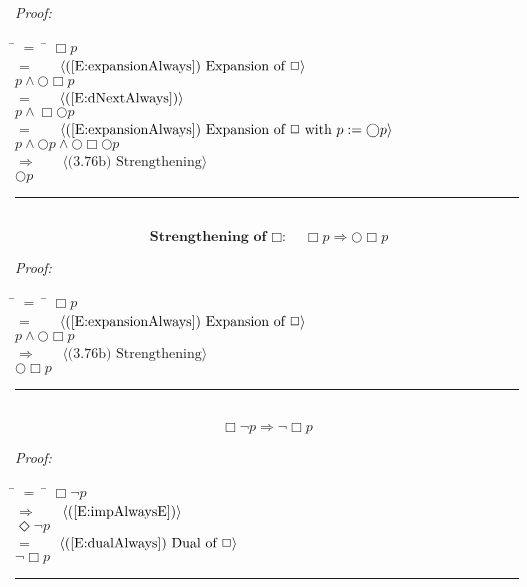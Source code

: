 \documentclass[fleqn, leqno]{article}
\newcommand{\lgap}{2pt}                             %
\newcommand{\mymathindent}{24pt}                    %
\newcommand{\Next}{\bigcirc}
\newcommand{\Event}{\Diamond}
\newcommand{\Always}{\Box}
\newcommand{\myqed}{\hfill\rule[-.23ex]{1.2ex}{2.0ex}}
\newcommand{\Gll} {\langle}                         %
\newcommand{\Ggg} {\rangle}                         %
\newcommand{\Hint}[1]     {\ \ \ $\Gll              \mbox{#1} \Ggg$ }   %
\begin{document}
\emph{Proof:}
\begin{tabbing}
\hspace{\mymathindent} \= $= \;$ \= \kill
  \> \>   $\Always p$\\[\lgap]
  \> $=$  \>  \Hint{(\ref{E:expansionAlways}) Expansion of $\Always$}\\[\lgap]
  \> \>   $p \land \Next\Always p$\\[\lgap]
  \> $=$  \>  \Hint{(\ref{E:dNextAlways})}\\[\lgap]
  \> \>   $p \land \Always\Next p$\\[\lgap]
  \> $=$  \>  \Hint{(\ref{E:expansionAlways}) Expansion of $\Always$ with $p := \Next p$}\\[\lgap]
  \> \>   $p \land \Next p \land \Next\Always\Next p$\\[\lgap]
  \> $\Rightarrow$  \>  \Hint{(3.76b) Strengthening}\\[\lgap]
  \> \>   $\Next p$\\[\lgap]
\end{tabbing}
\myqed\\[\lgap]


\begin{equation}\label{E:impAlwaysNA}
\textbf{Strengthening of $\Always$:}\quad \Always p \Rightarrow \Next\Always p
\end{equation}

\emph{Proof:}
\begin{tabbing}
\hspace{\mymathindent} \= $= \;$ \= \kill
  \> \>   $\Always p$\\[\lgap]
  \> $=$  \>  \Hint{(\ref{E:expansionAlways}) Expansion of $\Always$}\\[\lgap]
  \> \>   $p \land \Next\Always p$\\[\lgap]
  \> $\Rightarrow$  \>  \Hint{(3.76b) Strengthening}\\[\lgap]
  \> \>   $\Next\Always p$\\[\lgap]
\end{tabbing}
\myqed\\[\lgap]


\begin{equation}\label{E:exAlwaysNot}
\Always\lnot p \Rightarrow \lnot\Always p
\end{equation}

\emph{Proof:}
\begin{tabbing}
\hspace{\mymathindent} \= $= \;$ \= \kill
  \> \>   $\Always\lnot p$\\[\lgap]
  \> $\Rightarrow$  \>  \Hint{(\ref{E:impAlwaysE})}\\[\lgap]
  \> \>   $\Event\lnot p$\\[\lgap]
  \> $=$  \>  \Hint{(\ref{E:dualAlways}) Dual of $\Always$}\\[\lgap]
  \> \>   $\lnot\Always p$\\[\lgap]
\end{tabbing}
\myqed\\[\lgap]
\end{document}
